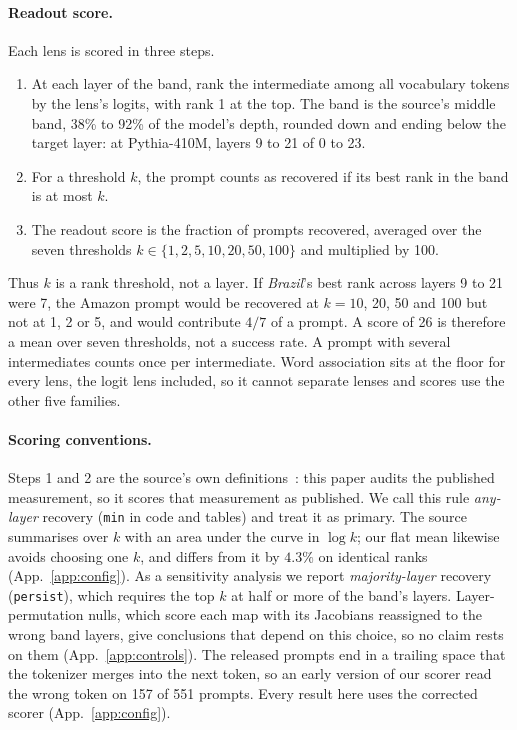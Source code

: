 \documentclass{article}
\newcommand{\mn}{\texttt{min}}
\newcommand{\pe}{\texttt{persist}}
\begin{document}
\paragraph{Readout score.} Each lens is scored in three steps.
\begin{enumerate}[leftmargin=*,itemsep=0pt,topsep=1pt]
\item At each layer of the band, rank the intermediate among all vocabulary tokens by the lens's
logits, with rank 1 at the top. The band is the source's middle band, 38\% to 92\% of the model's
depth, rounded down and ending below the target layer: at Pythia-410M, layers 9 to 21 of 0 to 23.
\item For a threshold $k$, the prompt counts as recovered if its best rank in the band is at most $k$.
\item The readout score is the fraction of prompts recovered, averaged over the seven thresholds
$k\in\{1,2,5,10,20,50,100\}$ and multiplied by 100.
\end{enumerate}
Thus $k$ is a rank threshold, not a layer. If \emph{Brazil}'s best rank across layers 9 to 21 were
7, the Amazon prompt would be recovered at $k=10$, 20, 50 and 100 but not at 1, 2 or 5, and would
contribute $4/7$ of a prompt. A score of 26 is therefore a mean over seven thresholds, not a success
rate. A prompt with several intermediates counts once per intermediate. Word association sits at the
floor for every lens, the logit lens included, so it cannot separate lenses and scores use the other
five families.

\paragraph{Scoring conventions.} Steps 1 and 2 are the source's own
definitions~\citep{gurnee2026}: this paper audits the published measurement, so it scores that
measurement as published. We call this rule \emph{any-layer} recovery (\mn{} in code and
tables) and treat it as primary. The source summarises over $k$ with an area under the curve in
$\log k$; our flat mean likewise avoids choosing one $k$, and differs from it by $4.3\%$ on identical
ranks (App.~\ref{app:config}). As a sensitivity analysis we report \emph{majority-layer} recovery
(\pe{}), which requires the top $k$ at half or more of the band's layers. Layer-permutation nulls,
which score each map with its Jacobians reassigned to the wrong band layers, give conclusions that
depend on this choice, so no claim rests on them (App.~\ref{app:controls}). The
released prompts end in a trailing space that the tokenizer merges into the next token, so an early
version of our scorer read the wrong token on 157 of 551 prompts. Every result here uses the corrected
scorer (App.~\ref{app:config}).
\end{document}
